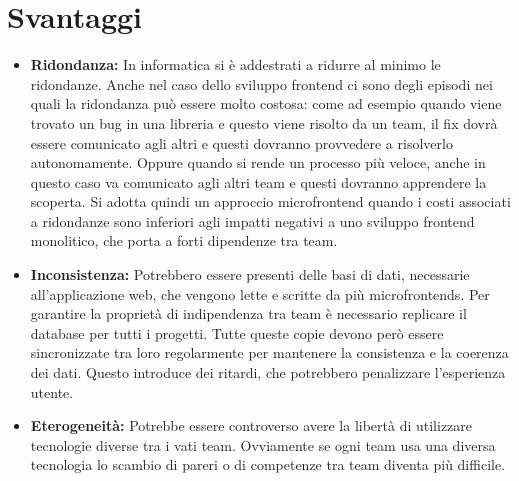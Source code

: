 \section{Svantaggi}
\begin{itemize}

\item \textbf{Ridondanza:}
In informatica si è addestrati a ridurre al minimo le ridondanze.
Anche nel caso dello sviluppo frontend ci sono degli episodi nei quali la ridondanza può
 essere molto costosa: come ad esempio quando viene trovato un bug in una libreria e 
 questo viene risolto da un team, il fix dovrà essere comunicato agli altri e questi 
 dovranno provvedere a risolverlo autonomamente. Oppure quando si rende un processo più 
 veloce, anche in questo caso va comunicato agli altri team e questi dovranno apprendere
  la scoperta.
Si adotta quindi un approccio microfrontend quando i costi associati a ridondanze sono 
inferiori agli impatti negativi a uno sviluppo frontend monolitico, che porta a forti 
dipendenze tra team.




\item \textbf{Inconsistenza:}
 Potrebbero essere presenti delle basi di dati, necessarie all'applicazione web, che vengono lette e scritte
 da più microfrontends.
Per garantire la proprietà di indipendenza tra team è necessario replicare il database per tutti i progetti. 
Tutte queste copie devono però essere sincronizzate tra loro regolarmente per mantenere la consistenza e la coerenza dei dati.
Questo introduce dei ritardi, che potrebbero penalizzare l'esperienza utente.

\item \textbf{Eterogeneità:}
Potrebbe essere controverso avere la libertà di utilizzare tecnologie diverse tra i vati team.
 Ovviamente se ogni team usa una diversa tecnologia lo scambio di pareri o di competenze 
 tra team diventa più difficile.
\end{itemize}